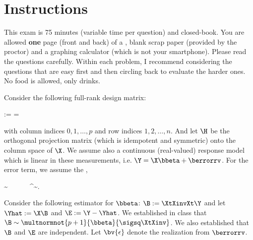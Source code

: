 \documentclass[12pt]{article}
\begin{document}
\section*{Instructions}
This exam is 75 minutes (variable time per question) and closed-book. You are allowed \textbf{one} page (front and back) of a , blank scrap paper (provided by the proctor) and a graphing calculator (which is not your smartphone). Please read the questions carefully. Within each problem, I recommend considering the questions that are easy first and then circling back to evaluate the harder ones. No food is allowed, only drinks. %

\pagebreak

\problem Consider the following full-rank design matrix:

\beqn
\X :=  = 
\eeqn

\noindent with column indices $0, 1, \ldots, p$ and row indices $1, 2, \ldots, n$. And let $\H$ be the orthogonal projection matrix (which is idempotent and symmetric) onto the column space of $\X$. We assume also a continuous (real-valued) response model which is linear in these measurements, i.e. $\Y = \X\bbeta + \berrorrv$. For the error term, we assume the ,

\beqn
\berrorrv \sim {} ~~~~~ \oneover{\sigsq} \berrorrv^\top\berrorrv \sim {}.
\eeqn

\noindent Consider the following estimator for $\bbeta$: $\B := \XtXinvXt \Y$ and let $\Yhat := \X\B$ and $\E := \Y - \Yhat$.  We established in class that $\B \sim \multnormnot{p+1}{\bbeta}{\sigsq \XtXinv}$. We also established that $\B$ and $\E$ are independent. Let $\bv{\epsilon}$ denote the realization from $\berrorrv$.
\end{document}
